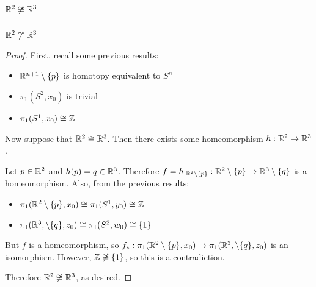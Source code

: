 \section{$\mathbb R^2 \not\cong\mathbb R^3$} 
\begin{theorem}
	$\mathbb R^2 \not \cong \mathbb R^3$
\end{theorem}
\begin{proof}
	First, recall some previous results: 
	\begin{itemize}
		\item $\mathbb R^{n+1} \setminus \{p\}$ is homotopy equivalent to $S^n$ 
		\item $\pi_1(S^2, x_0)$ is trivial 
		\item $\pi_1(S^1, x_0) \cong \mathbb Z$ 
	\end{itemize}
	
	Now suppose that $\mathbb R^2 \cong \mathbb R^3$. Then there exists some homeomorphism $h : \mathbb R^2 \to \mathbb R^3$. 
	
	Let $p \in \mathbb R^2$ and $h(p) = q \in \mathbb R^3$. Therefore $f = h|_{\mathbb R^2\setminus\{p\}} :\mathbb R^2\setminus\{p\} \to \mathbb R^3\setminus\{q\}$ is a homeomorphism. Also, from the previous results: 
	\begin{itemize}
		\item $\pi_1(\mathbb R^2 \setminus \{p\}, x_0) \cong \pi_1(S^1, y_0) \cong \mathbb Z$ 
		\item $\pi_1(\mathbb R^3, \setminus \{q\}, z_0) \cong \pi_1(S^2, w_0) \cong \{1\}$ 
	\end{itemize}
	But $f$ is a homeomorphism, so $f_* : \pi_1(\mathbb R^2 \setminus \{p\}, x_0) \to \pi_1(\mathbb R^3, \setminus \{q\}, z_0)$ is an isomorphism. However, $\mathbb Z \not \cong \{1\}$, so this is a contradiction. 
	
	Therefore $\mathbb R^2 \not \cong \mathbb R^3$, as desired. 
\end{proof}

